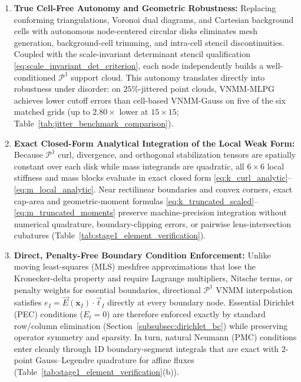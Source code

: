 \documentclass[VANCOUVER]{USG}
\begin{document}
\begin{enumerate}
    \item \textbf{True Cell-Free Autonomy and Geometric Robustness:} Replacing conforming triangulations, Voronoi dual diagrams, and Cartesian background cells with autonomous node-centered circular disks eliminates mesh generation, background-cell trimming, and intra-cell stencil discontinuities. Coupled with the scale-invariant determinant stencil qualification \eqref{eq:scale_invariant_det_criterion}, each node independently builds a well-conditioned $\mathcal{P}^1$ support cloud. This autonomy translates directly into robustness under disorder: on $25\%$-jittered point clouds, VNMM-MLPG achieves lower cutoff errors than cell-based VNMM-Gauss on five of the six matched grids (up to $2.80\times$ lower at $15\times 15$; Table~\ref{tab:jitter_benchmark_comparison}).
    \item \textbf{Exact Closed-Form Analytical Integration of the Local Weak Form:} Because $\mathcal{P}^1$ curl, divergence, and orthogonal stabilization tensors are spatially constant over each disk while mass integrands are quadratic, all $6\times 6$ local stiffness and mass blocks evaluate in exact closed form \eqref{eq:k_curl_analytic}--\eqref{eq:m_local_analytic}. Near rectilinear boundaries and convex corners, exact cap-area and geometric-moment formulas \eqref{eq:k_truncated_scaled}--\eqref{eq:m_truncated_moments} preserve machine-precision integration without numerical quadrature, boundary-clipping errors, or pairwise lens-intersection cubatures (Table~\ref{tab:stage1_element_verification}).
    \item \textbf{Direct, Penalty-Free Boundary Condition Enforcement:} Unlike moving least-squares (MLS) meshfree approximations that lose the Kronecker-delta property and require Lagrange multipliers, Nitsche terms, or penalty weights for essential boundaries, directional $\mathcal{P}^1$ VNMM interpolation satisfies $e_I = \vec{E}(\mathbf{x}_I)\cdot\vec{t}_I$ directly at every boundary node. Essential Dirichlet (PEC) conditions ($E_t = 0$) are therefore enforced exactly by standard row/column elimination (Section~\ref{subsubsec:dirichlet_bc}) while preserving operator symmetry and sparsity. In turn, natural Neumann (PMC) conditions enter cleanly through 1D boundary-segment integrals that are exact with 2-point Gauss--Legendre quadrature for affine fluxes (Table~\ref{tab:stage1_element_verification}(b)).

\end{enumerate}
\end{document}
